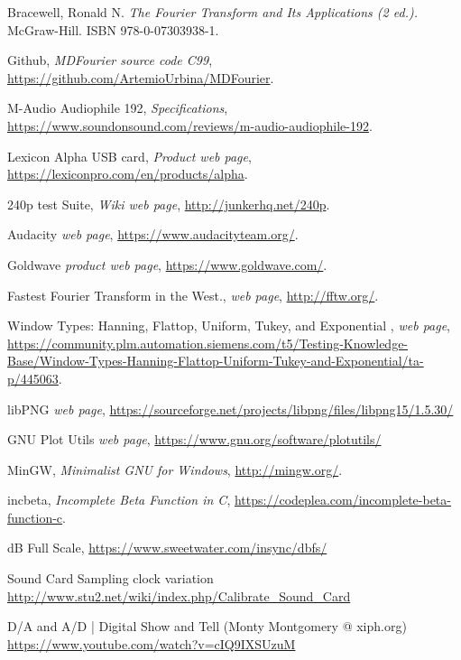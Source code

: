 \documentclass[10pt,a4paper]{report}
\begin{document}
\begin{thebibliography}{9}
	Bracewell, Ronald N. 
	\textit{The Fourier Transform and Its Applications (2 ed.).}
	McGraw-Hill. ISBN 978-0-07303938-1.
	
	Github,
	\textit{MDFourier source code C99},
	\url{https://github.com/ArtemioUrbina/MDFourier}.
	
	M-Audio Audiophile 192,
	\textit{Specifications},
	\url{https://www.soundonsound.com/reviews/m-audio-audiophile-192}.
	
	Lexicon Alpha USB card,
	\textit{Product web page},
	\url{https://lexiconpro.com/en/products/alpha}.
	
	240p test Suite,
	\textit{Wiki web page},
	\url{http://junkerhq.net/240p}.
	
	Audacity
	\textit{web page},
	\url{https://www.audacityteam.org/}.
	
	Goldwave
	\textit{product web page},
	\url{https://www.goldwave.com/}.
	
	Fastest Fourier Transform in the West.,
	\textit{web page},
	\url{http://fftw.org/}.
	
	Window Types: Hanning, Flattop, Uniform, Tukey, and Exponential ,
	\textit{web page},
	\url{https://community.plm.automation.siemens.com/t5/Testing-Knowledge-Base/Window-Types-Hanning-Flattop-Uniform-Tukey-and-Exponential/ta-p/445063}.
	
	libPNG
	\textit{web page},
	\url{https://sourceforge.net/projects/libpng/files/libpng15/1.5.30/}
	
	GNU Plot Utils
	\textit{web page},
	\url{https://www.gnu.org/software/plotutils/}
	
	MinGW, 
	\textit{Minimalist GNU for Windows},
	\url{http://mingw.org/}.
	
	incbeta, 
	\textit{Incomplete Beta Function in C},
	\url{https://codeplea.com/incomplete-beta-function-c}.
	
	dB Full Scale, 
	\url{https://www.sweetwater.com/insync/dbfs/}
	
	Sound Card Sampling clock variation
	\url{http://www.stu2.net/wiki/index.php/Calibrate_Sound_Card}
	
	D/A and A/D | Digital Show and Tell (Monty Montgomery @ xiph.org)
	\url{https://www.youtube.com/watch?v=cIQ9IXSUzuM}
\end{thebibliography}
\end{document}
